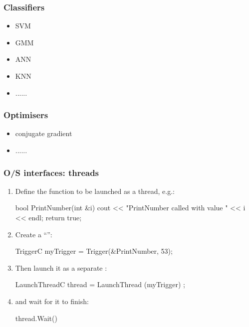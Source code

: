 \documentclass[landscape]{beamer}
\begin{document}
\begin{frame}[fragile]\frametitle{Classifiers}


  \begin{itemize}
  \item SVM
  \item GMM
  \item ANN
  \item KNN
  \item ......
  \end{itemize}

\end{frame}

\begin{frame}[fragile]\frametitle{Optimisers}

  \begin{itemize}
  \item conjugate gradient
  \item ......
  \end{itemize}

\end{frame}


\begin{frame}[fragile]\frametitle{O/S interfaces: threads}

  \begin{enumerate}
  \item Define the function to be launched as a thread, e.g.:

\begin{Code}
  bool PrintNumber(int &i) {
    cout << "PrintNumber called with value " << i << endl;
    return true;
  }
\end{Code}

  \item Create a ``'': 

\begin{Code}
  TriggerC myTrigger = Trigger(&PrintNumber, 53);
\end{Code}

  \item Then launch it as a separate :

\begin{Code}
  LaunchThreadC thread = LaunchThread (myTrigger) ; 
\end{Code}

\item and wait for it to finish:

\begin{Code}
  thread.Wait()
\end{Code}



\end{enumerate}
\end{frame}
\end{document}
